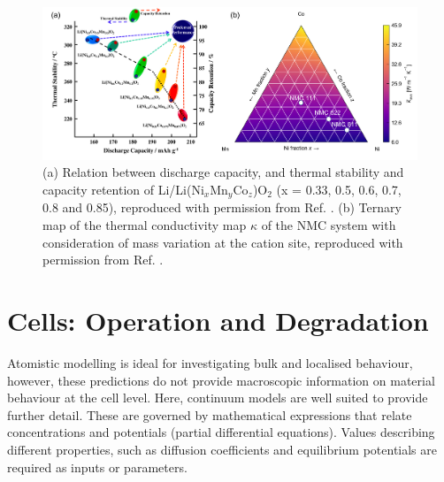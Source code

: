 \documentclass[journal=jacsat,manuscript=article]{achemso}
\begin{document}
\begin{figure}[]
  \centering
    \includegraphics[width=16cm]{Figures/P_thermal.png}
    \caption{(a) Relation between discharge capacity, and thermal stability and capacity retention of Li/Li(Ni$_x$Mn$_y$Co$_z$)O$_2$ (x = 0.33, 0.5, 0.6, 0.7, 0.8 and 0.85), reproduced with permission from Ref. . (b) Ternary map of the thermal conductivity map $\kappa$ of the NMC system with consideration of mass variation at the cation site, reproduced with permission from Ref. .}
  \label{figure_thermal}
\end{figure}



\section*{Cells: Operation and Degradation}
Atomistic modelling is ideal for investigating bulk and localised behaviour, however, these predictions do not provide macroscopic information on material behaviour at the cell level. 
Here, continuum models are well suited to provide further detail. 
These are governed by mathematical expressions that relate concentrations and potentials (partial differential equations). Values describing different properties, such as diffusion coefficients and equilibrium potentials are required as inputs or parameters.
\end{document}
